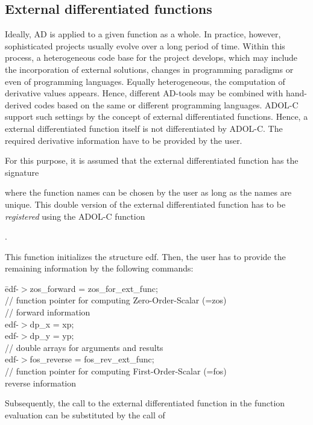 \documentclass[11pt,twoside]{article}
\begin{document}
\subsection{External differentiated functions}
%
Ideally, AD is applied to a given function as a whole.
In practice, however, sophisticated projects usually evolve over a long period of time.
Within this process, a heterogeneous code base for the project
develops, which may include the incorporation of external solutions,
changes in programming paradigms or even of programming languages.
Equally heterogeneous, the computation of derivative values appears.
Hence, different \mbox{AD-tools} may be combined with hand-derived
codes based on the same or different programming languages. 
ADOL-C support such settings  by the concept of external
differentiated functions. Hence, a external differentiated function
itself is not differentiated by ADOL-C. The required derivative
information have to be provided by the user.

For this purpose, it is assumed that the external differentiated
function has the signature
\smallskip

\noindent
\hspace*{2cm}{\sf int ext\_func(int n, double *yin, int m, double  *yout);}
\medskip

\noindent
where the function names can be chosen by the user as long as the names are
unique. This {\sf double} version of the external differentiated function has to
be {\em registered} using the \mbox{ADOL-C} function
\smallskip

\noindent
\hspace*{2cm}{\sf edf = reg\_ext\_fct(ext\_func);}.
\smallskip

\noindent
This function initializes the structure {\sf edf}. Then, 
the user has to provide the remaining  information
by the following commands:
\begin{tabbing}
\hspace*{2cm}\= {\sf edf-$>$zos\_forward = zos\_for\_ext\_func;}\\
             \> {\sf // function pointer for computing
               Zero-Order-Scalar (=zos)}\\
             \> {\sf // forward information}\\
             \> {\sf edf-$>$dp\_x = xp;}\\
             \> {\sf edf-$>$dp\_y = yp;}\\
             \> {\sf // double arrays for arguments and results}\\
             \> {\sf edf-$>$fos\_reverse = fos\_rev\_ext\_func;} \\
             \> {\sf // function pointer for computing
               First-Order-Scalar (=fos)}\\ 
             \> {\sf reverse information}
\end{tabbing}
Subsequently, the call to the external differentiated function  in the function evaluation can be
substituted by the call of
\medskip
\end{document}
